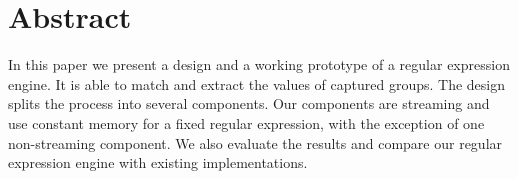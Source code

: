 \section*{Abstract}



In this paper we present a design and a working prototype of a regular
expression engine. It is able to match and extract the values of
captured groups. The design splits the process into several
components. Our components are streaming and use constant memory for a
fixed regular expression, with the exception of one non-streaming
component. We also evaluate the results and compare our regular
expression engine with existing implementations. 
